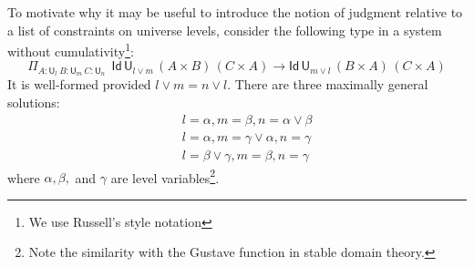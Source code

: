 \documentclass[11pt,a4paper]{article}
\theoremstyle{definition}
\newcommand{\Id}{\mathsf{Id}}
\newcommand{\UU}{\mathsf{U}}
\begin{document}
To motivate why it may be useful to introduce the notion of judgment relative to a list of constraints on universe levels, consider the following type in a system without cumulativity\footnote{We use Russell's style notation}:
%
$$
    \Pi_{A:\UU_l~{B}:{\UU_m}~{C}:{\UU_n}}
    {~~\Id\,\UU_{l \vee m}\, (A\times B)\,(C \times A)
    \to \Id\,\UU_{m \vee l} \, (B\times A)\,(C \times A)}
$$
It is well-formed provided $l \vee m = n \vee l$. There are three maximally general solutions:
\begin{eqnarray*}
&&l = \alpha, m = \beta, n = \alpha \vee \beta\\
&&l = \alpha, m = \gamma \vee \alpha, n = \gamma\\
&&l = \beta \vee \gamma, m = \beta, n = \gamma
\end{eqnarray*}
where $\alpha, \beta,$ and $\gamma$ are level
variables\footnote{Note the similarity with the Gustave function in stable domain theory.}.
%
\end{document}
